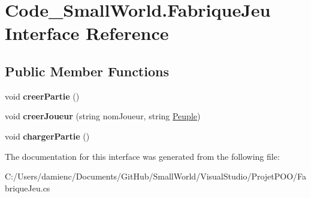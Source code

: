\hypertarget{interface_code___small_world_1_1_fabrique_jeu}{\section{Code\-\_\-\-Small\-World.\-Fabrique\-Jeu Interface Reference}
\label{interface_code___small_world_1_1_fabrique_jeu}
}
\subsection*{Public Member Functions}
\begin{DoxyCompactItemize}
\item 
\hypertarget{interface_code___small_world_1_1_fabrique_jeu_ae7b678cd987b4f77a19a272d65cf8fa4}{void {\bfseries creer\-Partie} ()}\label{interface_code___small_world_1_1_fabrique_jeu_ae7b678cd987b4f77a19a272d65cf8fa4}

\item 
\hypertarget{interface_code___small_world_1_1_fabrique_jeu_aad85073c518e20f457b8f7e50222c314}{void {\bfseries creer\-Joueur} (string nom\-Joueur, string \hyperlink{interface_code___small_world_1_1_peuple}{Peuple})}\label{interface_code___small_world_1_1_fabrique_jeu_aad85073c518e20f457b8f7e50222c314}

\item 
\hypertarget{interface_code___small_world_1_1_fabrique_jeu_aef37e4bf07611be63bb1b2c91c5dc5d1}{void {\bfseries charger\-Partie} ()}\label{interface_code___small_world_1_1_fabrique_jeu_aef37e4bf07611be63bb1b2c91c5dc5d1}

\end{DoxyCompactItemize}


The documentation for this interface was generated from the following file\-:\begin{DoxyCompactItemize}
\item 
C\-:/\-Users/damienc/\-Documents/\-Git\-Hub/\-Small\-World/\-Visual\-Studio/\-Projet\-P\-O\-O/Fabrique\-Jeu.\-cs\end{DoxyCompactItemize}
